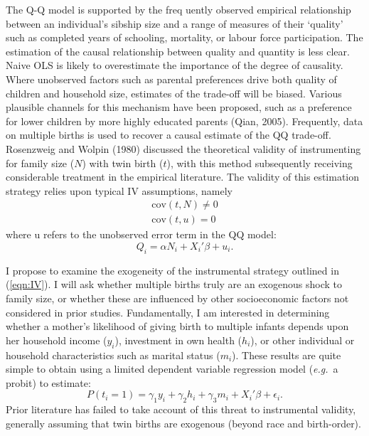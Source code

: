 \documentclass{article}[11pt,subeqn]
\begin{document}
\begin{spacing}{1.25}
The Q-Q model is supported by the freq	uently observed empirical relationship between an individual's sibship size and a
range of measures of their `quality' such as completed years of schooling, mortality, or labour force participation.
The estimation of the causal relationship between quality and quantity is less clear. Naive OLS is
likely to overestimate the importance of the degree of causality.  Where unobserved factors such
as parental preferences drive both quality of children and household size, estimates of the
trade-off will be biased.  Various plausible channels for this mechanism have been proposed, such
as a preference for lower children by more highly educated parents (Qian, 2005). Frequently, data
on multiple births is used to recover a causal estimate of the QQ trade-off. Rosenzweig and Wolpin
(1980) discussed the theoretical validity of instrumenting for family size ($N$) with twin birth ($t$),
with this method subsequently receiving considerable treatment in the empirical literature.  The
validity of this estimation strategy relies upon typical IV assumptions, namely
\begin{equation}
\label{eqn:IV}
\begin{aligned}
\text{cov}(t,N)\neq0 \\
\text{cov}(t,u)=0
\end{aligned}
\end{equation}
where u refers to the unobserved error term in the QQ model:
\begin{equation}
\label{eqn:model}
Q_i=\alpha N_i + X_i'\beta + u_i.
\end{equation}

I propose to examine the exogeneity of the instrumental strategy outlined in (\ref{eqn:IV}).
I will ask whether multiple births truly are an exogenous shock to family size, or whether these are
influenced by other socioeconomic factors not considered in prior studies.  Fundamentally, I am
interested in determining whether a mother's likelihood of giving birth to multiple infants depends upon
her household income ($y_i$), investment in own health ($h_i$), or other individual or household
characteristics such as marital status ($m_i$).  These results are quite simple to obtain using a limited
dependent variable regression model (\emph{e.g.}\ a probit) to estimate:
\begin{equation}
\label{eqn:twin}
P(t_i=1)=\gamma_1 y_i + \gamma_2 h_i + \gamma_3 m_i +X_i'\beta + \epsilon_i.
\end{equation}
Prior literature has failed to take account of this threat to instrumental validity, generally assuming
that twin births are exogenous (beyond race and birth-order).


\end{spacing}
\end{document}
